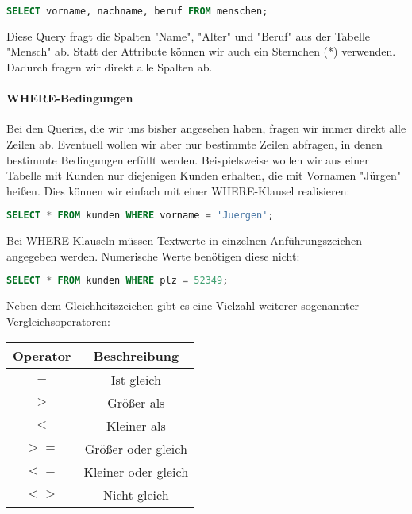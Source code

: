 \documentclass{article}
\begin{document}
	\begin{lstlisting}[language=SQL]
	SELECT vorname, nachname, beruf FROM menschen;
	\end{lstlisting}

	Diese Query fragt die Spalten "Name", "Alter" und "Beruf" aus der Tabelle "Mensch" ab.
	Statt der Attribute können wir auch ein Sternchen (*) verwenden. Dadurch fragen wir direkt alle Spalten ab.

	\paragraph{WHERE-Bedingungen}
	Bei den Queries, die wir uns bisher angesehen haben, fragen wir immer direkt alle Zeilen ab. Eventuell wollen wir aber nur bestimmte Zeilen abfragen, in denen bestimmte Bedingungen erfüllt werden. Beispielsweise wollen wir aus einer Tabelle mit Kunden nur diejenigen Kunden erhalten, die mit Vornamen "Jürgen" heißen. Dies können wir einfach mit einer WHERE-Klausel realisieren:

	\begin{lstlisting}[language=SQL]
	SELECT * FROM kunden WHERE vorname = 'Juergen';
	\end{lstlisting}

	Bei WHERE-Klauseln müssen Textwerte in einzelnen Anführungszeichen angegeben werden. Numerische Werte benötigen diese nicht:

	\begin{lstlisting}[language=SQL]
	SELECT * FROM kunden WHERE plz = 52349;
	\end{lstlisting}

	Neben dem Gleichheitszeichen gibt es eine Vielzahl weiterer sogenannter Vergleichsoperatoren:

	\begin{center}
		\def\arraystretch{1.1}
		\begin{tabular}{ | c | c |}
			\hline 
			\textbf{Operator} & \textbf{Beschreibung} \\
			\hline
			\hline
			\textbf{$=$} & Ist gleich \\
			\textbf{$>$} & Größer als \\
			\textbf{$<$} & Kleiner als \\
			\textbf{$>=$} & Größer oder gleich \\
			\textbf{$<=$} & Kleiner oder gleich \\
			\textbf{$<>$} & Nicht gleich \\
			\hline
		\end{tabular}
	\end{center}
\end{document}
